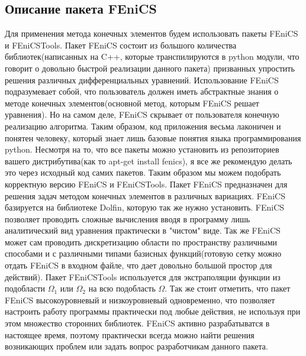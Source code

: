 \subsection{Описание пакета FEniCS}

Для применения метода конечных элементов будем использовать пакеты FEniCS и FEniCSTools.
Пакет FEniCS состоит из большого количества библиотек(написанных на C++, которые транспилируются в python модули, что говорит о довольно быстрой реализации данного пакета) призванных упростить решения различных дифференциальных уравнений. 
Использование FEniCS подразумевает собой, что пользователь должен иметь абстрактные знания о методе конечных элементов(основной метод, которым FEniCS решает уравнения). Но на самом деле, FEniCS скрывает от пользователя конечную реализацию алгоритма. Таким образом, код приложения весьма лаконичен и понятен человеку, который знает лишь базовые понятия языка программирования python.
Несмотря на то, что все пакеты можно установить из репозиториев вашего дистрибутива(как то apt-get install fenics), я все же рекомендую делать это через исходный код самих пакетов. Таким образом мы можем подобрать корректную версию FEniCS и FEniCSTools.
Пакет FEniCS предназначен для решения задач методом конечных элементов в различных вариациях. 
FEniCS базируется на библиотеке Dolfin, которую так же нужно установить. FEniCS позволяет проводить сложные вычисления
вводя в программу лишь аналитический вид уравнения практически в "чистом" виде. Так же FEniCS может сам проводить 
дискретизацию области по пространству различными способами и с различными типами базисных функций(готовую
 сетку можно отдать FEniCS в входном файле, что дает довольно большой простор для действий). Пакет FEniCSTools используется
для экстраполяции функции из подобласти $\Omega_1$ или $\Omega_2$ на всю подобласть $\Omega$. Так же стоит
отметить, что пакет FEniCS высокоуровневый и низкоуровневый одновременно, что позволяет настроить работу программы
практически под любые действия, не используя при этом множество сторонних библиотек. FEniCS активно разрабатыватся в настоящее
время, поэтому практически всегда можно найти решения возникающих проблем или задать вопрос разработчикам данного пакета.
